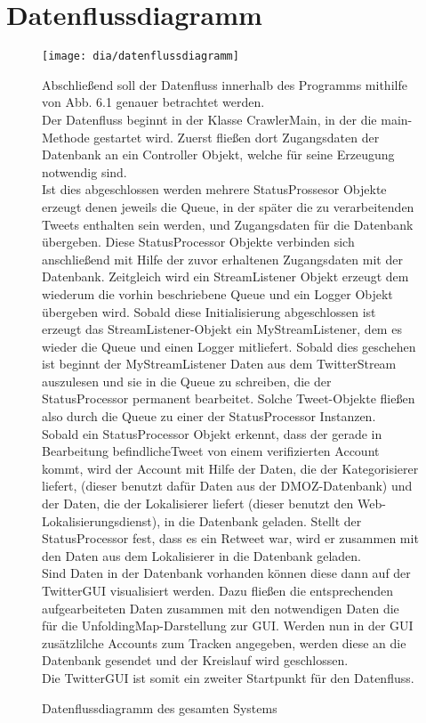 \section{Datenflussdiagramm}

\begin{figure}[h!]
	\centering
	\texttt{[image: dia/datenflussdiagramm]}
	\caption{Datenflussdiagramm des gesamten Systems}
	\label{fig:datenflussdiagramm}
	
	\begin{description}
	Abschließend soll der Datenfluss innerhalb des Programms mithilfe von Abb. 6.1 genauer betrachtet werden.\\
	Der Datenfluss beginnt in der Klasse CrawlerMain, in der die main-Methode gestartet wird. Zuerst fließen dort Zugangsdaten der Datenbank an ein Controller Objekt, welche für seine Erzeugung notwendig sind. \\
	Ist dies abgeschlossen werden mehrere StatusProssesor Objekte erzeugt denen jeweils die Queue, in der später die zu verarbeitenden Tweets enthalten sein werden, und Zugangsdaten für die Datenbank übergeben. Diese StatusProcessor Objekte verbinden sich anschließend mit Hilfe der zuvor erhaltenen Zugangsdaten mit der Datenbank. Zeitgleich wird ein StreamListener Objekt erzeugt dem wiederum die vorhin beschriebene Queue und ein Logger Objekt übergeben wird. Sobald diese Initialisierung abgeschlossen ist erzeugt das StreamListener-Objekt ein MyStreamListener, dem es wieder die Queue und einen Logger mitliefert. Sobald dies geschehen ist beginnt der MyStreamListener Daten aus dem TwitterStream auszulesen und sie in die Queue zu schreiben, die der StatusProcessor permanent bearbeitet. Solche Tweet-Objekte fließen also durch die Queue zu einer der StatusProcessor Instanzen. \\
	Sobald ein StatusProcessor Objekt erkennt, dass der gerade in Bearbeitung befindlicheTweet von einem verifizierten Account kommt, wird der Account mit Hilfe der Daten, die der Kategorisierer liefert, (dieser benutzt dafür Daten aus der DMOZ-Datenbank) und der Daten, die der Lokalisierer liefert (dieser benutzt den Web-Lokalisierungsdienst), in die Datenbank geladen. Stellt der StatusProcessor fest, dass es ein Retweet war, wird er zusammen mit den Daten aus dem Lokalisierer in die Datenbank geladen.\\
	Sind Daten in der Datenbank vorhanden können diese dann auf der TwitterGUI visualisiert werden. Dazu fließen die entsprechenden aufgearbeiteten Daten zusammen mit den notwendigen Daten die für die UnfoldingMap-Darstellung zur GUI. Werden nun in der GUI zusätzlilche Accounts zum Tracken angegeben, werden diese an die Datenbank gesendet und der Kreislauf wird geschlossen.\\
	Die TwitterGUI ist somit ein zweiter Startpunkt für den Datenfluss.	
	\end{description}
\end{figure}